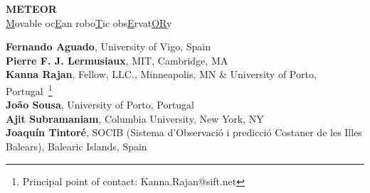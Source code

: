 \begin{titlepage}

  \begin{center}

    
    \Large{\textbf{METEOR}\\
      \underline{M}ovable oc\underline{E}an robo\underline{T}ic obs\underline{E}rvat\underline{OR}y}

  \vspace{+5in}
  \large
  \textbf{Fernando Aguado}, University of Vigo, Spain\\
  \textbf{Pierre F. J. Lermusiaux}, MIT, Cambridge, MA\\
  \textbf{Kanna Rajan}, Fellow, \org LLC., Minneapolis, MN \& University of Porto, Portugal~\footnote{Principal point of
    contact: Kanna.Rajan@sift.net}\\
  \textbf{Jo\~ao Sousa}, University of Porto, Portugal\\
  \textbf{Ajit Subramaniam}, Columbia University, New York, NY\\
  \textbf{Joaqu\'{i}n Tintor\'{e}}, SOCIB (Sistema d’Observaci\'{o} i predicci\'{o} Costaner de les Illes Balears), Balearic Islands, Spain\\
  \vspace{+0.2in}



\end{center}
\end{titlepage}

